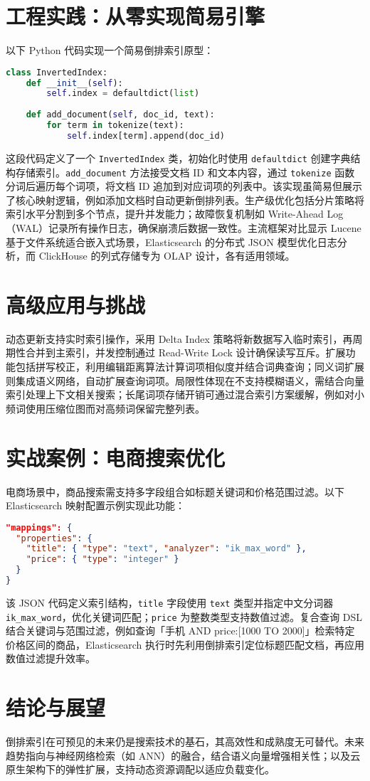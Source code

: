 \chapter{工程实践：从零实现简易引擎}
以下 Python 代码实现一个简易倒排索引原型：\par
\begin{lstlisting}[language=python]
class InvertedIndex:
    def __init__(self):
        self.index = defaultdict(list)
    
    def add_document(self, doc_id, text):
        for term in tokenize(text):
            self.index[term].append(doc_id)
\end{lstlisting}
这段代码定义了一个 \texttt{InvertedIndex} 类，初始化时使用 \texttt{defaultdict} 创建字典结构存储索引。\texttt{add\_{}document} 方法接受文档 ID 和文本内容，通过 \texttt{tokenize} 函数分词后遍历每个词项，将文档 ID 追加到对应词项的列表中。该实现虽简易但展示了核心映射逻辑，例如添加文档时自动更新倒排列表。生产级优化包括分片策略将索引水平分割到多个节点，提升并发能力；故障恢复机制如 Write-Ahead Log（WAL）记录所有操作日志，确保崩溃后数据一致性。主流框架对比显示 Lucene 基于文件系统适合嵌入式场景，Elasticsearch 的分布式 JSON 模型优化日志分析，而 ClickHouse 的列式存储专为 OLAP 设计，各有适用领域。\par
\chapter{高级应用与挑战}
动态更新支持实时索引操作，采用 Delta Index 策略将新数据写入临时索引，再周期性合并到主索引，并发控制通过 Read-Write Lock 设计确保读写互斥。扩展功能包括拼写校正，利用编辑距离算法计算词项相似度并结合词典查询；同义词扩展则集成语义网络，自动扩展查询词项。局限性体现在不支持模糊语义，需结合向量索引处理上下文相关搜索；长尾词项存储开销可通过混合索引方案缓解，例如对小频词使用压缩位图而对高频词保留完整列表。\par
\chapter{实战案例：电商搜索优化}
电商场景中，商品搜索需支持多字段组合如标题关键词和价格范围过滤。以下 Elasticsearch 映射配置示例实现此功能：\par
\begin{lstlisting}[language=json]
"mappings": {
  "properties": {
    "title": { "type": "text", "analyzer": "ik_max_word" },
    "price": { "type": "integer" }
  }
}
\end{lstlisting}
该 JSON 代码定义索引结构，\texttt{title} 字段使用 \texttt{text} 类型并指定中文分词器 \texttt{ik\_{}max\_{}word}，优化关键词匹配；\texttt{price} 为整数类型支持数值过滤。复合查询 DSL 结合关键词与范围过滤，例如查询「手机 AND price:[1000 TO 2000]」检索特定价格区间的商品，Elasticsearch 执行时先利用倒排索引定位标题匹配文档，再应用数值过滤提升效率。\par
\chapter{结论与展望}
倒排索引在可预见的未来仍是搜索技术的基石，其高效性和成熟度无可替代。未来趋势指向与神经网络检索（如 ANN）的融合，结合语义向量增强相关性；以及云原生架构下的弹性扩展，支持动态资源调配以适应负载变化。\par
